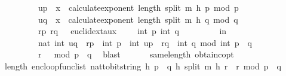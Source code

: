 \begin{isabellebody}
\ \ \ \ \ \ \ \ \ u{\isacharunderscore}{\kern0pt}p\ {\isacharequal}{\kern0pt}\ x\ {\isacharcircum}{\kern0pt}\ calculate{\isacharunderscore}{\kern0pt}exponent\ {\isacharparenleft}{\kern0pt}length\ {\isacharparenleft}{\kern0pt}split\ m\ h{\isacharparenright}{\kern0pt}{\isacharparenright}{\kern0pt}\ p\ mod\ p{\isacharsemicolon}{\kern0pt}\isanewline
\ \ \ \ \ \ \ \ \ u{\isacharunderscore}{\kern0pt}q\ {\isacharequal}{\kern0pt}\ x\ {\isacharcircum}{\kern0pt}\ calculate{\isacharunderscore}{\kern0pt}exponent\ {\isacharparenleft}{\kern0pt}length\ {\isacharparenleft}{\kern0pt}split\ m\ h{\isacharparenright}{\kern0pt}{\isacharparenright}{\kern0pt}\ q\ mod\ q{\isacharsemicolon}{\kern0pt}\isanewline
\ \ \ \ \ \ \ \ \ {\isacharparenleft}{\kern0pt}{\isacharparenleft}{\kern0pt}r{\isacharunderscore}{\kern0pt}p{\isacharcomma}{\kern0pt}\ r{\isacharunderscore}{\kern0pt}q{\isacharparenright}{\kern0pt}{\isacharcomma}{\kern0pt}\ {\isacharunderscore}{\kern0pt}{\isacharparenright}{\kern0pt}\ {\isacharequal}{\kern0pt}\ euclid{\isacharunderscore}{\kern0pt}ext{\isacharunderscore}{\kern0pt}aux\ {}\ {}\ {}\ {}\ {\isacharparenleft}{\kern0pt}int\ p{\isacharparenright}{\kern0pt}\ {\isacharparenleft}{\kern0pt}int\ q{\isacharparenright}{\kern0pt}\isanewline
\ \ \ \ \ \ \ \ \ in\isanewline
\ \ \ \ \ \ \ \ \ nat\ {\isacharparenleft}{\kern0pt}{\isacharparenleft}{\kern0pt}int\ u{\isacharunderscore}{\kern0pt}q\ {\isacharasterisk}{\kern0pt}\ r{\isacharunderscore}{\kern0pt}p\ {\isacharasterisk}{\kern0pt}\ int\ p\ {\isacharplus}{\kern0pt}\ int\ u{\isacharunderscore}{\kern0pt}p\ {\isacharasterisk}{\kern0pt}\ r{\isacharunderscore}{\kern0pt}q\ {\isacharasterisk}{\kern0pt}\ int\ q{\isacharparenright}{\kern0pt}\ mod\ int\ {\isacharparenleft}{\kern0pt}p\ {\isacharasterisk}{\kern0pt}\ q{\isacharparenright}{\kern0pt}{\isacharparenright}{\kern0pt}{\isacharparenright}{\kern0pt}\ {\isacharequal}{\kern0pt}\isanewline
\ \ \ \ \ \ \ \ \ r\ {\isacharcircum}{\kern0pt}\ {}\ mod\ {\isacharparenleft}{\kern0pt}p\ {\isacharasterisk}{\kern0pt}\ q{\isacharparenright}{\kern0pt}{\isachardoublequoteclose}\ \isamarkupfalse%
\ blast\isanewline
\ \ \isanewline
\ \ \isamarkupfalse%
\ same{\isacharunderscore}{\kern0pt}length\ obtain{\isacharunderscore}{\kern0pt}c{\isacharunderscore}{\kern0pt}opt{}\ \isanewline
\ \ \isamarkupfalse%
\ {\isachardoublequoteopen}length\ {\isacharparenleft}{\kern0pt}enc{\isacharunderscore}{\kern0pt}loop{\isacharunderscore}{\kern0pt}func{\isacharunderscore}{\kern0pt}list\ {\isacharparenleft}{\kern0pt}nat{\isacharunderscore}{\kern0pt}to{\isacharunderscore}{\kern0pt}bitstring\ h{\isacharcomma}{\kern0pt}\ p\ {\isacharasterisk}{\kern0pt}\ q{\isacharcomma}{\kern0pt}\ h{\isacharcomma}{\kern0pt}\ {\isacharparenleft}{\kern0pt}split\ m\ h{\isacharparenright}{\kern0pt}{\isacharparenright}{\kern0pt}\ {\isacharparenleft}{\kern0pt}r\ {\isacharasterisk}{\kern0pt}\ r\ mod\ {\isacharparenleft}{\kern0pt}p\ {\isacharasterisk}{\kern0pt}\ q{\isacharparenright}{\kern0pt}{\isacharparenright}{\kern0pt}{\isacharparenright}{\kern0pt}\isanewline

\end{isabellebody}
